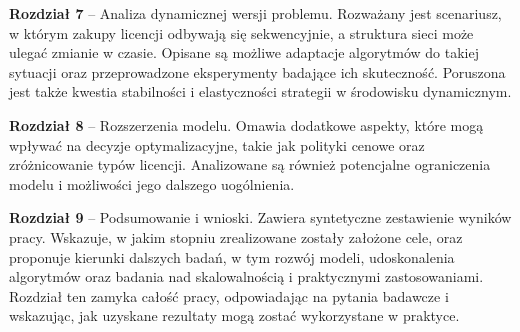 \begin{description}
  \item \textbf{Rozdział 7} -- Analiza dynamicznej wersji problemu. Rozważany jest scenariusz, w którym zakupy licencji odbywają się sekwencyjnie, a struktura sieci może ulegać zmianie w czasie. Opisane są możliwe adaptacje algorytmów do takiej sytuacji oraz przeprowadzone eksperymenty badające ich skuteczność. Poruszona jest także kwestia stabilności i elastyczności strategii w środowisku dynamicznym.

  \item \textbf{Rozdział 8} -- Rozszerzenia modelu. Omawia dodatkowe aspekty, które mogą wpływać na decyzje optymalizacyjne, takie jak polityki cenowe oraz zróżnicowanie typów licencji. Analizowane są również potencjalne ograniczenia modelu i możliwości jego dalszego uogólnienia.

  \item \textbf{Rozdział 9} -- Podsumowanie i wnioski. Zawiera syntetyczne zestawienie wyników pracy. Wskazuje, w jakim stopniu zrealizowane zostały założone cele, oraz proponuje kierunki dalszych badań, w tym rozwój modeli, udoskonalenia algorytmów oraz badania nad skalowalnością i praktycznymi zastosowaniami. Rozdział ten zamyka całość pracy, odpowiadając na pytania badawcze i wskazując, jak uzyskane rezultaty mogą zostać wykorzystane w praktyce.
\end{description}
